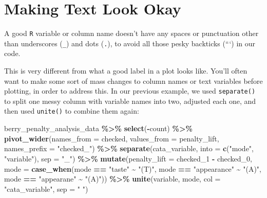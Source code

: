 \documentclass[
]{book}
\newenvironment{Shaded}{\begin{snugshade}}{\end{snugshade}}
\newcommand{\AttributeTok}[1]{\textcolor[rgb]{0.13,0.29,0.53}{#1}}
\newcommand{\FunctionTok}[1]{\textcolor[rgb]{0.13,0.29,0.53}{\textbf{#1}}}
\newcommand{\NormalTok}[1]{#1}
\newcommand{\SpecialCharTok}[1]{\textcolor[rgb]{0.81,0.36,0.00}{\textbf{#1}}}
\newcommand{\StringTok}[1]{\textcolor[rgb]{0.31,0.60,0.02}{#1}}
\begin{document}
\hypertarget{making-text-look-okay}{%
\section{Making Text Look Okay}\label{making-text-look-okay}}

A good \texttt{R} variable or column name doesn't have any spaces or punctuation other than underscores (\texttt{\_}) and dots (\texttt{.}), to avoid all those pesky backticks (```) in our code.

This is very different from what a good label in a plot looks like. You'll often want to make some sort of mass changes to column names or text variables before plotting, in order to address this. In our previous example, we used \texttt{separate()} to split one messy column with variable names into two, adjusted each one, and then used \texttt{unite()} to combine them again:

\begin{Shaded}
\begin{Highlighting}[]
\NormalTok{berry\_penalty\_analysis\_data }\SpecialCharTok{\%\textgreater{}\%}
  \FunctionTok{select}\NormalTok{(}\SpecialCharTok{{-}}\NormalTok{count) }\SpecialCharTok{\%\textgreater{}\%}
  \FunctionTok{pivot\_wider}\NormalTok{(}\AttributeTok{names\_from =}\NormalTok{ checked,}
              \AttributeTok{values\_from =}\NormalTok{ penalty\_lift,}
              \AttributeTok{names\_prefix =} \StringTok{"checked\_"}\NormalTok{) }\SpecialCharTok{\%\textgreater{}\%}
  \FunctionTok{separate}\NormalTok{(cata\_variable, }
           \AttributeTok{into =} \FunctionTok{c}\NormalTok{(}\StringTok{"mode"}\NormalTok{, }\StringTok{"variable"}\NormalTok{), }
           \AttributeTok{sep =} \StringTok{"\_"}\NormalTok{) }\SpecialCharTok{\%\textgreater{}\%}
  \FunctionTok{mutate}\NormalTok{(}\AttributeTok{penalty\_lift =}\NormalTok{ checked\_1 }\SpecialCharTok{{-}}\NormalTok{ checked\_0,}
         \AttributeTok{mode =} \FunctionTok{case\_when}\NormalTok{(mode }\SpecialCharTok{==} \StringTok{"taste"} \SpecialCharTok{\textasciitilde{}} \StringTok{"(T)"}\NormalTok{,}
\NormalTok{                          mode }\SpecialCharTok{==} \StringTok{"appearance"} \SpecialCharTok{\textasciitilde{}} \StringTok{"(A)"}\NormalTok{,}
\NormalTok{                          mode }\SpecialCharTok{==} \StringTok{"appearane"} \SpecialCharTok{\textasciitilde{}} \StringTok{"(A)"}\NormalTok{)) }\SpecialCharTok{\%\textgreater{}\%}
  \FunctionTok{unite}\NormalTok{(variable, mode, }\AttributeTok{col =} \StringTok{"cata\_variable"}\NormalTok{, }\AttributeTok{sep =} \StringTok{" "}\NormalTok{)}
\end{Highlighting}
\end{Shaded}
\end{document}
